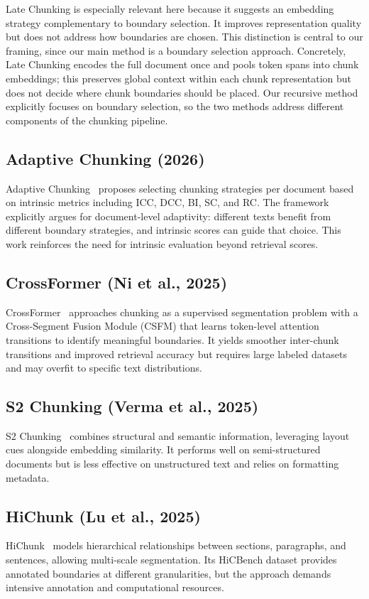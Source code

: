 \documentclass[conference]{IEEEtran}
\begin{document}
Late Chunking is especially relevant here because it suggests an embedding
strategy complementary to boundary selection. It improves representation
quality but does not address how boundaries are chosen. This distinction is
central to our framing, since our main method is a boundary selection
approach. Concretely, Late Chunking encodes the full document once and
pools token spans into chunk embeddings; this preserves global context
within each chunk representation but does not decide where chunk
boundaries should be placed. Our recursive method explicitly focuses on
boundary selection, so the two methods address different components of the
chunking pipeline.

\subsection{Adaptive Chunking (2026)}
Adaptive Chunking~\cite{adaptive2026} proposes selecting chunking strategies
per document based on intrinsic metrics including ICC, DCC, BI, SC, and RC.
The framework explicitly argues for document-level adaptivity: different
texts benefit from different boundary strategies, and intrinsic scores can
guide that choice. This work reinforces the need for intrinsic evaluation
beyond retrieval scores.

\subsection{CrossFormer (Ni et al., 2025)}
CrossFormer~\cite{ni2025crossformer} approaches chunking as a supervised
segmentation problem with a Cross-Segment Fusion Module (CSFM) that learns
token-level attention transitions to identify meaningful boundaries. It
yields smoother inter-chunk transitions and improved retrieval accuracy but
requires large labeled datasets and may overfit to specific text
distributions.

\subsection{S2 Chunking (Verma et al., 2025)}
S2 Chunking~\cite{verma2025s2} combines structural and semantic information,
leveraging layout cues alongside embedding similarity. It performs well on
semi-structured documents but is less effective on unstructured text and
relies on formatting metadata.

\subsection{HiChunk (Lu et al., 2025)}
HiChunk~\cite{lu2025hichunk} models hierarchical relationships between
sections, paragraphs, and sentences, allowing multi-scale segmentation. Its
HiCBench dataset provides annotated boundaries at different granularities,
but the approach demands intensive annotation and computational resources.
\end{document}
